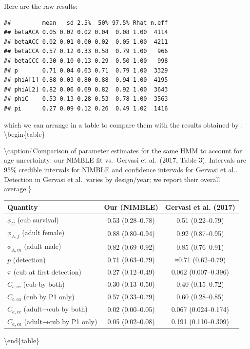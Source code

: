 \documentclass[
  12pt,
]{krantz}
\begin{document}
Here are the raw results:

\begin{verbatim}
##         mean   sd 2.5%  50% 97.5% Rhat n.eff
## betaACA 0.05 0.02 0.02 0.04  0.08 1.00  4114
## betaACC 0.02 0.01 0.00 0.02  0.05 1.00  4211
## betaCCA 0.57 0.12 0.33 0.58  0.79 1.00   966
## betaCCC 0.30 0.10 0.13 0.29  0.50 1.00   998
## p       0.71 0.04 0.63 0.71  0.79 1.00  3329
## phiA[1] 0.88 0.03 0.80 0.88  0.94 1.00  4195
## phiA[2] 0.82 0.06 0.69 0.82  0.92 1.00  3643
## phiC    0.53 0.13 0.28 0.53  0.78 1.00  3563
## pi      0.27 0.09 0.12 0.26  0.49 1.02  1416
\end{verbatim}

which we can arrange in a table to compare them with the results obtained by \citet{Gervasi2017}:
\textbackslash begin\{table\}

\textbackslash caption\{\label{tab:unnamed-chunk-374}Comparison of parameter estimates for the same HMM to account for age uncertainty: our NIMBLE fit vs.~Gervasi et al.~(2017, Table 3). Intervals are 95\% credible intervals for NIMBLE and confidence intervals for Gervasi et al.. Detection in Gervasi et al.~varies by design/year; we report their overall average.\}
\centering

\begin{tabular}[t]{l|c|c}
\hline
Quantity & Our (NIMBLE) & Gervasi et al. (2017)\\
\hline
$\phi_C$ (cub survival) & 0.53 (0.28–0.78) & 0.51 (0.22–0.79)\\
\hline
$\phi_{A,f}$ (adult female) & 0.88 (0.80–0.94) & 0.92 (0.87–0.95)\\
\hline
$\phi_{A,m}$ (adult male) & 0.82 (0.69–0.92) & 0.85 (0.76–0.91)\\
\hline
$p$ (detection) & 0.71 (0.63–0.79) & ≈0.71 (0.62–0.79)\\
\hline
$\pi$ (cub at first detection) & 0.27 (0.12–0.49) & 0.062 (0.007–0.396)\\
\hline
$C_{c,cc}$ (cub by both) & 0.30 (0.13–0.50) & 0.40 (0.15–0.72)\\
\hline
$C_{c,ca}$ (cub by P1 only) & 0.57 (0.33–0.79) & 0.60 (0.28–0.85)\\
\hline
$C_{a,cc}$ (adult→cub by both) & 0.02 (0.00–0.05) & 0.067 (0.024–0.174)\\
\hline
$C_{a,ca}$ (adult→cub by P1 only) & 0.05 (0.02–0.08) & 0.191 (0.110–0.309)\\
\hline
\end{tabular}

\textbackslash end\{table\}
\end{document}
